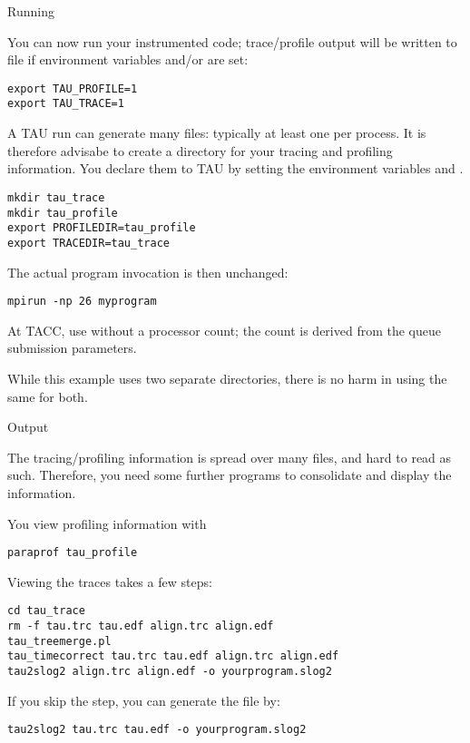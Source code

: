  {Running}

You can now run your instrumented code;
trace/profile output will be written to file 
if environment variables  and/or  are set:
\begin{verbatim}
export TAU_PROFILE=1
export TAU_TRACE=1
\end{verbatim}

A TAU run can generate many files: typically at least one per process.
It is therefore advisabe to create a directory for your tracing and profiling
information. You declare them to TAU by setting the environment variables
 and .
\begin{verbatim}
mkdir tau_trace
mkdir tau_profile
export PROFILEDIR=tau_profile
export TRACEDIR=tau_trace
\end{verbatim}

The actual program invocation is then unchanged:
\begin{verbatim}
mpirun -np 26 myprogram
\end{verbatim}

\begin{taccnote}
At TACC, use  without a processor count;
the count is derived from the queue submission parameters.
\end{taccnote}

While this example uses two separate directories, there is no
harm in using the same for both.

 {Output}

The tracing/profiling information is spread over many files, and hard to read as such.
Therefore, you need some further programs to consolidate and display the information.

You view profiling information with 
\begin{verbatim}
paraprof tau_profile
\end{verbatim}
Viewing the traces takes a few steps:
\begin{verbatim}
cd tau_trace
rm -f tau.trc tau.edf align.trc align.edf
tau_treemerge.pl
tau_timecorrect tau.trc tau.edf align.trc align.edf
tau2slog2 align.trc align.edf -o yourprogram.slog2
\end{verbatim}
If you skip the  step, you can generate the
 file by:
\begin{verbatim}
tau2slog2 tau.trc tau.edf -o yourprogram.slog2
\end{verbatim}


